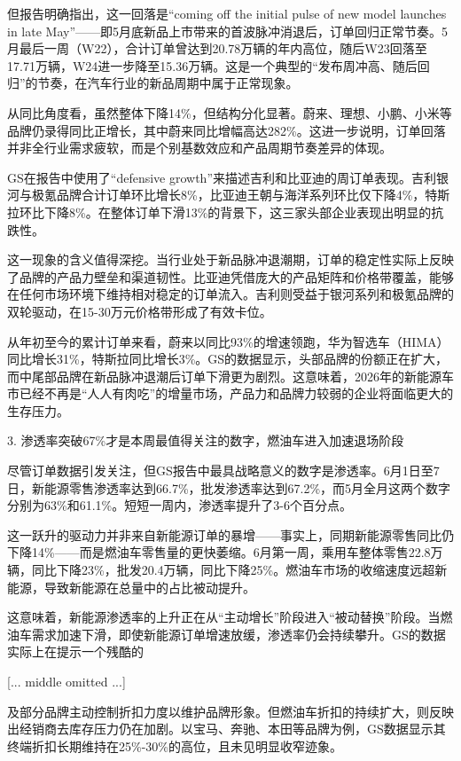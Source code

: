 \documentclass[11pt]{ctexart}
\begin{document}
但报告明确指出，这一回落是“coming off the initial pulse of new model launches in late May”——即5月底新品上市带来的首波脉冲消退后，订单回归正常节奏。5月最后一周（W22），合计订单曾达到20.78万辆的年内高位，随后W23回落至17.71万辆，W24进一步降至15.36万辆。这是一个典型的“发布周冲高、随后回归”的节奏，在汽车行业的新品周期中属于正常现象。

从同比角度看，虽然整体下降14\%，但结构分化显著。蔚来、理想、小鹏、小米等品牌仍录得同比正增长，其中蔚来同比增幅高达282\%。这进一步说明，订单回落并非全行业需求疲软，而是个别基数效应和产品周期节奏差异的体现。

GS在报告中使用了“defensive growth”来描述吉利和比亚迪的周订单表现。吉利银河与极氪品牌合计订单环比增长8\%，比亚迪王朝与海洋系列环比仅下降4\%，特斯拉环比下降8\%。在整体订单下滑13\%的背景下，这三家头部企业表现出明显的抗跌性。

这一现象的含义值得深挖。当行业处于新品脉冲退潮期，订单的稳定性实际上反映了品牌的产品力壁垒和渠道韧性。比亚迪凭借庞大的产品矩阵和价格带覆盖，能够在任何市场环境下维持相对稳定的订单流入。吉利则受益于银河系列和极氪品牌的双轮驱动，在15-30万元价格带形成了有效卡位。

从年初至今的累计订单来看，蔚来以同比93\%的增速领跑，华为智选车（HIMA）同比增长31\%，特斯拉同比增长3\%。GS的数据显示，头部品牌的份额正在扩大，而中尾部品牌在新品脉冲退潮后订单下滑更为剧烈。这意味着，2026年的新能源车市已经不再是“人人有肉吃”的增量市场，产品力和品牌力较弱的企业将面临更大的生存压力。

3. 渗透率突破67\%才是本周最值得关注的数字，燃油车进入加速退场阶段

尽管订单数据引发关注，但GS报告中最具战略意义的数字是渗透率。6月1日至7日，新能源零售渗透率达到66.7\%，批发渗透率达到67.2\%，而5月全月这两个数字分别为63\%和61.1\%。短短一周内，渗透率提升了3-6个百分点。

这一跃升的驱动力并非来自新能源订单的暴增——事实上，同期新能源零售同比仍下降14\%——而是燃油车零售量的更快萎缩。6月第一周，乘用车整体零售22.8万辆，同比下降23\%，批发20.4万辆，同比下降25\%。燃油车市场的收缩速度远超新能源，导致新能源在总量中的占比被动提升。

这意味着，新能源渗透率的上升正在从“主动增长”阶段进入“被动替换”阶段。当燃油车需求加速下滑，即使新能源订单增速放缓，渗透率仍会持续攀升。GS的数据实际上在提示一个残酷的

[... middle omitted ...]

及部分品牌主动控制折扣力度以维护品牌形象。但燃油车折扣的持续扩大，则反映出经销商去库存压力仍在加剧。以宝马、奔驰、本田等品牌为例，GS数据显示其终端折扣长期维持在25\%-30\%的高位，且未见明显收窄迹象。
\end{document}
